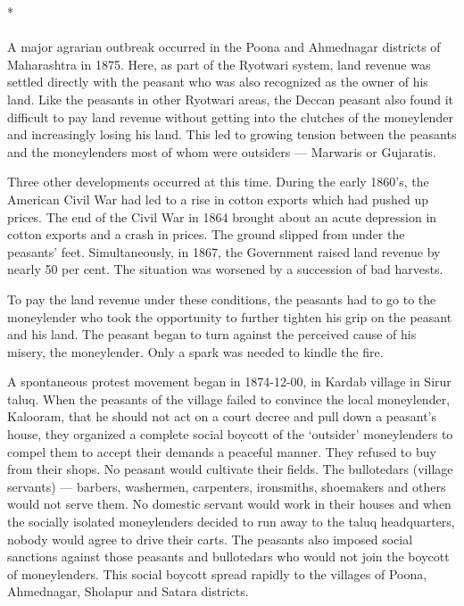 \begin{multicols}{2}
\begin{center}*\end{center}

\paragraph*{}
A major agrarian outbreak occurred in the Poona and Ahmednagar districts of Maharashtra in 1875. Here, as part of the Ryotwari system, land revenue was settled directly with the peasant who was also recognized as the owner of his land. Like the peasants in other Ryotwari areas, the Deccan peasant also found it difficult to pay land revenue without getting into the clutches of the moneylender and increasingly losing his land. This led to growing tension between the peasants and the moneylenders most of whom were outsiders --- Marwaris or Gujaratis.

Three other developments occurred at this time. During the early 1860's, the American Civil War had led to a rise in cotton exports which had pushed up prices. The end of the Civil War in 1864 brought about an acute depression in cotton exports and a crash in prices. The ground slipped from under the peasants' feet. Simultaneously, in 1867, the Government raised land revenue by nearly 50 per cent. The situation was worsened by a succession of bad harvests.

To pay the land revenue under these conditions, the peasants had to go to the moneylender who took the opportunity to further tighten his grip on the peasant and his land. The peasant began to turn against the perceived cause of his misery, the moneylender. Only a spark was needed to kindle the fire.

A spontaneous protest movement began in 1874-12-00, in Kardab village in Sirur taluq. When the peasants of the village failed to convince the local moneylender, Kalooram, that he should not act on a court decree and pull down a peasant's house, they organized a complete social boycott of the `outsider' moneylenders to compel them to accept their demands a peaceful manner. They refused to buy from their shops. No peasant would cultivate their fields. The bullotedars (village servants) --- barbers, washermen, carpenters, ironsmiths, shoemakers and others would not serve them. No domestic servant would work in their houses and when the socially isolated moneylenders decided to run away to the taluq headquarters, nobody would agree to drive their carts. The peasants also imposed social sanctions against those peasants and bullotedars who would not join the boycott of moneylenders. This social boycott spread rapidly to the villages of Poona, Ahmednagar, Sholapur and Satara districts.


\end{multicols}
